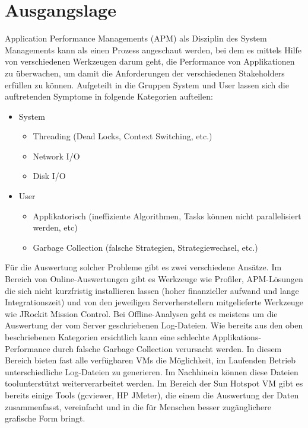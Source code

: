 \section{Ausgangslage}\label{ausgangslage}
Application Performance Managements (APM) als Disziplin des System Managements kann als einen Prozess angeschaut werden, bei dem es mittels Hilfe von verschiedenen Werkzeugen darum geht, die Performance von Applikationen zu \"uberwachen, um damit die Anforderungen der verschiedenen Stakeholders erf\"ullen zu k\"onnen.
Aufgeteilt in die Gruppen System und User lassen sich die auftretenden Symptome in folgende Kategorien aufteilen:
\begin{itemize}
\item System
	\begin{itemize}
		\item Threading (Dead Locks, Context Switching, etc.)
		\item Network I/O
		\item Disk I/O
	\end{itemize}
\item User
	\begin{itemize}
		\item Applikatorisch (ineffiziente Algorithmen, Tasks k\"onnen nicht parallelisiert werden, etc)
		\item Garbage Collection (falsche Strategien, Strategiewechsel, etc.)
	\end{itemize}
\end{itemize}

F\"ur die Auswertung solcher Probleme gibt es zwei verschiedene Ans\"atze. Im Bereich von Online-Auswertungen gibt es Werkzeuge wie Profiler, APM-L\"osungen die sich nicht kurzfristig installieren lassen (hoher finanzieller aufwand und lange Integrationszeit) und von den jeweiligen Serverherstellern mitgelieferte Werkzeuge wie JRockit Mission Control. Bei Offline-Analysen geht es meistens um die Auswertung der vom Server geschriebenen Log-Dateien.
Wie bereits aus den oben beschriebenen Kategorien ersichtlich kann eine schlechte Applikations-Performance durch falsche Garbage Collection verursacht werden. In diesem Bereich bieten fast alle verf\"ugbaren VMs die M\"oglichkeit, im Laufenden Betrieb unterschiedliche Log-Dateien zu generieren. Im Nachhinein k\"onnen diese Dateien toolunterst\"utzt weiterverarbeitet werden. Im Bereich der Sun Hotspot VM gibt es bereits einige Tools (gcviewer, HP JMeter), die einem die Auswertung der Daten zusammenfasst, vereinfacht und in die f\"ur Menschen besser zug\"anglichere grafische Form bringt. 

